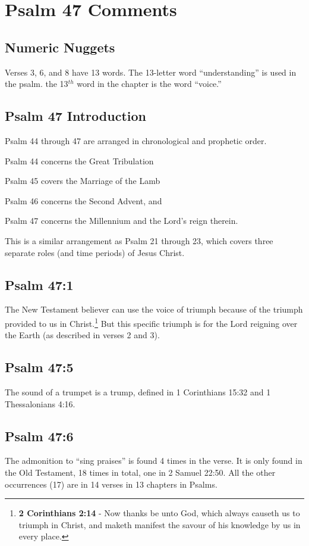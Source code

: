 \section{Psalm 47 Comments}

\subsection{Numeric Nuggets}
Verses 3, 6, and 8 have 13 words. The 13-letter word ``understanding'' is used in the psalm. the 13$^{th}$ word in the chapter is the word ``voice.''

\subsection{Psalm 47 Introduction}
Psalm 44 through 47 are arranged in chronological and prophetic order.
\begin{compactenum}
	\item Psalm 44 concerns the Great Tribulation
	\item Psalm 45 covers the Marriage of the Lamb
	\item Psalm 46 concerns the Second Advent, and
	\item Psalm 47 concerns the Millennium and the Lord's reign therein.
\end{compactenum}

This is a similar arrangement as Psalm 21 through 23, which covers three separate roles (and time periods) of Jesus Christ.

\subsection{Psalm 47:1}
The New Testament believer can use the voice of triumph because of the triumph provided to us in Christ.\footnote{\textbf{2 Corinthians 2:14} - Now thanks be unto God, which always causeth us to triumph in Christ, and maketh manifest the savour of his knowledge by us in every place.} But this specific triumph is for the Lord reigning over the Earth (as described in verses 2 and 3).

\subsection{Psalm 47:5}
The sound of a trumpet is a trump, defined in 1 Corinthians 15:32 and 1 Thessalonians 4:16.

\subsection{Psalm 47:6}
The admonition to ``sing praises'' is found 4 times in the verse.  It is only found in the Old Testament, 18 times in total, one in 2 Samuel 22:50. All the other occurrences (17) are in 14 verses in 13 chapters in Psalms.